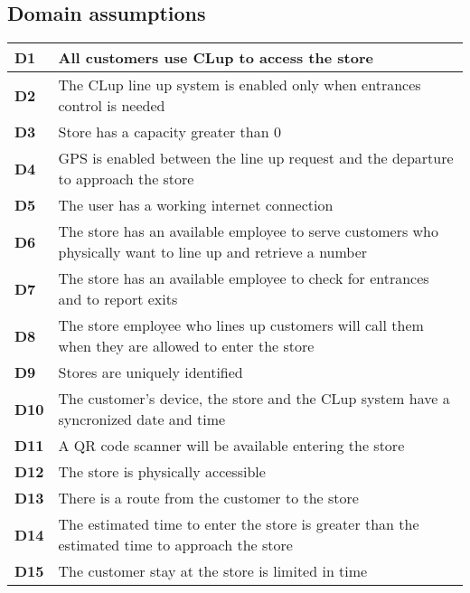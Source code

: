 \subsection{Domain assumptions}

    \begin{center}
        {\renewcommand{\arraystretch}{2}%
        \begin{tabular}{L{2cm}L{12cm}}
            \hline
            \textbf{D1} & All customers use CLup to access the store \\
            \hline
            \textbf{D2} & The CLup line up system is enabled only when entrances control is needed \\
            \hline
            \textbf{D3} & Store has a capacity greater than 0 \\
            \hline
            \textbf{D4} & GPS is enabled between the line up request and the departure to approach the store \\
            \hline
            \textbf{D5} & The user has a working internet connection \\
            \hline
            \textbf{D6} & The store has an available employee to serve customers who physically want to line up and retrieve a number \\
            \hline
            \textbf{D7} & The store has an available employee to check for entrances and to report exits \\
            \hline
            \textbf{D8} & The store employee who lines up customers will call them when they are allowed to enter the store \\
            \hline
            \textbf{D9} & Stores are uniquely identified \\
            \hline
            \textbf{D10} & The customer's device, the store and the CLup system have a syncronized date and time \\
            \hline
            \textbf{D11} & A QR code scanner will be available entering the store \\
            \hline
            \textbf{D12} & The store is physically accessible \\
            \hline
            \textbf{D13} & There is a route from the customer to the store \\
            \hline
            \textbf{D14} & The estimated time to enter the store is greater than the estimated time to approach the store \\
            \hline
            \textbf{D15} & The customer stay at the store is limited in time \\

\end{tabular}}
\end{center}
